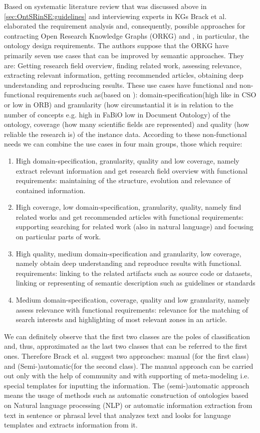 		Based on systematic literature review\cite{Kit07} that was discussed above in \autoref{sec:OntSRinSE:guidelines} and interviewing experts in KGs Brack et al. \cite{Bra20} elaborated the requirement analysis and, consequently, possible approaches for contracting Open Research Knowledge Graphs (ORKG) and , in particular, the ontology design requirements. The authors suppose that the ORKG have primarily seven use cases that can be improved by semantic approaches. They are: Getting research field overview, finding related work, assessing relevance, extracting relevant information, getting recommended articles,  obtaining deep understanding and reproducing results. These use cases have functional and non-functional requirements such as(based on \cite[p. 8]{Bra20}): domain-specification(high like in CSO or low in ORB) and granularity (how circumstantial it is in relation to the number of concepts e.g. high in FaBiO low in Document Ontology) of the ontology, coverage (how many scientific fields are represented) and quality (how reliable the research is) of the instance data. According to these non-functional needs we can combine the use cases in four main groups, those which require: 
			\begin{enumerate}
				\item High domain-specification, granularity, quality and low coverage, namely extract relevant information and get research field overview with functional requirements: maintaining of the structure, evolution and relevance of contained information.  
				\item High coverage, low domain-specification, granularity, quality, namely find related works and get recommended articles with functional requirements: supporting searching for related work (also in natural language) and focusing on particular parts of work. 
				\item High quality, medium domain-specification and granularity, low coverage, namely obtain deep understanding and reproduce results with functional. requirements: linking to the related artifacts such as source code or datasets, linking or representing of semantic description such as guidelines or standards
				\item Medium domain-specification, coverage, quality and low granularity, namely assess relevance with functional requirements: relevance for the matching of search interests and highlighting of most relevant zones in an article. 
			\end{enumerate} 
		We can definitely observe that the first two classes are the poles of classification and, thus, approximated as the last two classes that can be referred to the first ones. Therefore Brack et al. \cite{Bra20} suggest two approaches: manual (for the first class) and (Semi-)automatic(for the second class). The manual approach can be carried out only with the help of community and with supporting of meta-modeling i.e. special templates for inputting the information. The (semi-)automatic approach means the usage of methods such as automatic construction of ontologies based on Natural language processing (NLP) or automatic information extraction from text in sentence or phrasal level that analyzes text and looks for language templates and extracts information from it.
		
